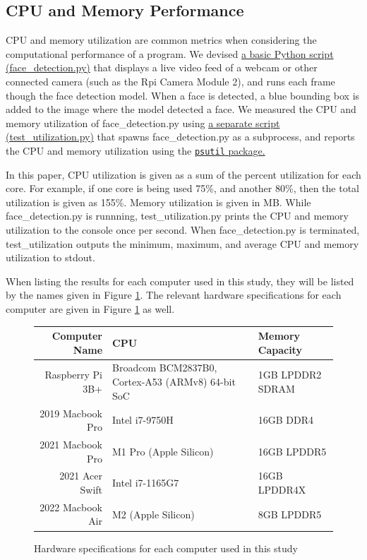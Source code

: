 \documentclass[conference]{IEEEtran}
\begin{document}
\subsection{CPU and Memory Performance}
CPU and memory utilization are common metrics when considering the computational performance of a program. We devised \href{https://github.com/etleyden/cmsc436-research-paper/blob/main/src/face_detection.py}{a basic Python script (face\_detection.py)} that displays a live video feed of a webcam or other connected camera (such as the Rpi Camera Module 2), and runs each frame though the face detection model. When a face is detected, a blue bounding box is added to the image where the model detected a face. We measured the CPU and memory utilization of face\_detection.py using \href{https://github.com/etleyden/cmsc436-research-paper/blob/main/src/test_utilization.py}{a separate script (test\_utilization.py)} that spawns face\_detection.py as a subprocess, and reports the CPU and memory utilization using the \href{https://pypi.org/project/psutil/}{\texttt{psutil} package.} 

In this paper, CPU utilization is given as a sum of the percent utilization for each core. For example, if one core is being used 75\%, and another 80\%, then the total utilization is given as 155\%. Memory utilization is given in MB. While face\_detection.py is runnning, test\_utilization.py prints the CPU and memory utilization to the console once per second. When face\_detection.py is terminated, test\_utilization outputs the minimum, maximum, and average CPU and memory utilization to stdout. 

When listing the results for each computer used in this study, they will be listed by the names given in Figure \ref{hardware_specs}. The relevant hardware specifications for each computer are given in Figure \ref{hardware_specs} as well. 
\begin{figure}[htbp]
\begin{center}
\begin{tabular}{|r|>{\raggedright\arraybackslash}m{7.5em}|>{\raggedright\arraybackslash}m{6em}|} \hline
Computer Name & CPU & Memory Capacity \\ \hline
Raspberry Pi 3B+ & Broadcom BCM2837B0, Cortex-A53 (ARMv8) 64-bit SoC & 1GB LPDDR2 SDRAM \\ \hline
2019 Macbook Pro & Intel i7-9750H & 16GB DDR4 \\ \hline
2021 Macbook Pro & M1 Pro (Apple Silicon) & 16GB LPDDR5 \\ \hline
2021 Acer Swift & Intel i7-1165G7 & 16GB LPDDR4X \\ \hline
2022 Macbook Air & M2 (Apple Silicon) & 8GB LPDDR5 \\ \hline
\end{tabular}
\caption{Hardware specifications for each computer used in this study}
\captionsetup{justification=centering}
\label{hardware_specs}
\end{center}
\end{figure}
\vspace{-10pt}
\end{document}
